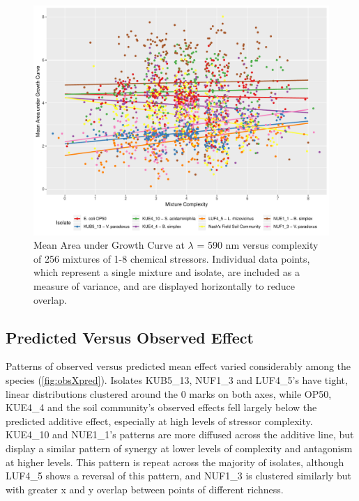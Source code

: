 \documentclass[final,1p,times]{elsarticle}
\begin{document}
\begin{figure}[H]
    \centering
    \includegraphics[width = \textwidth]{Scripts/Results/Final_Pipeline/growthXrichness.pdf}
    \caption{Mean Area under Growth Curve at $\lambda$ = 590 nm versus complexity of 256 mixtures of 1-8 chemical stressors. Individual data points, which represent a single mixture and isolate, are included as a measure of variance, and are displayed horizontally to reduce overlap.}
    \label{fig:growthXcomplex}
\end{figure}

\newpage
\subsection{Predicted Versus Observed Effect}
\label{S:3:5}

Patterns of observed versus predicted mean effect varied considerably among the species (\cref{fig:obsXpred}). Isolates KUB5\_13, NUF1\_3 and LUF4\_5’s have tight, linear distributions clustered around the 0 marks on both axes, while OP50, KUE4\_4 and the soil community’s observed effects fell largely below the predicted additive effect, especially at high levels of stressor complexity. KUE4\_10 and NUE1\_1’s patterns are more diffused across the additive line, but display a similar pattern of synergy at lower levels of complexity and antagonism at higher levels. This pattern is repeat across the majority of isolates, although LUF4\_5 shows a reversal of this pattern, and NUF1\_3 is clustered similarly but with greater x and y overlap between points of different richness.
\end{document}
